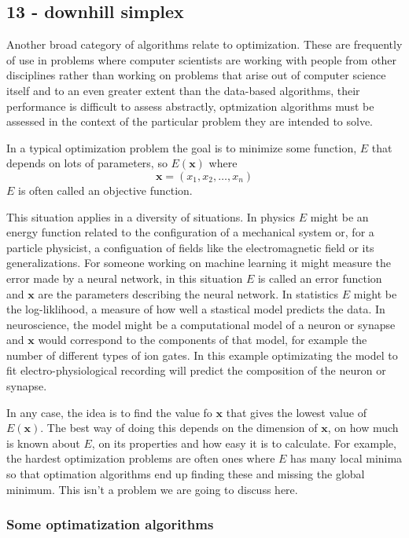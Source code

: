 \documentclass[11pt,a4paper]{scrartcl}
\begin{document}
\subsection*{13 - downhill simplex}

Another broad category of algorithms relate to optimization. These are
frequently of use in problems where computer scientists are working
with people from other disciplines rather than working on problems
that arise out of computer science itself and to an even greater
extent than the data-based algorithms, their performance is difficult
to assess abstractly, optmization algorithms must be assessed in the
context of the particular problem they are intended to solve.

In a typical optimization problem the goal is to minimize some
function, $E$ that depends on lots of parameters, so $E(\mathbf{x})$ where
\begin{equation}
\mathbf{x}=(x_1,x_2,\ldots,x_n)
\end{equation}
$E$ is often called an objective function.

This situation applies in a diversity of situations. In physics $E$
might be an energy function related to the configuration of a
mechanical system or, for a particle physicist, a configuation of
fields like the electromagnetic field or its generalizations. For
someone working on machine learning it might measure the error made by
a neural network, in this situation $E$ is called an error function
and $\mathbf{x}$ are the parameters describing the neural network. In
statistics $E$ might be the log-liklihood, a measure of how well a
stastical model predicts the data. In neuroscience, the model might be
a computational model of a neuron or synapse and $\mathbf{x}$ would
correspond to the components of that model, for example the number of
different types of ion gates. In this example optimizating the model
to fit electro-physiological recording will predict the composition of
the neuron or synapse. 

In any case, the idea is to find the value fo $\mathbf{x}$ that gives
the lowest value of $E(\mathbf{x})$. The best way of doing this
depends on the dimension of $\mathbf{x}$, on how much is known about
$E$, on its properties and how easy it is to calculate. For example,
the hardest optimization problems are often ones where $E$ has many
local minima so that optimation algorithms end up finding these and
missing the global minimum. This isn't a problem we are going to
discuss here.


\subsubsection*{Some optimatization algorithms}
\end{document}
